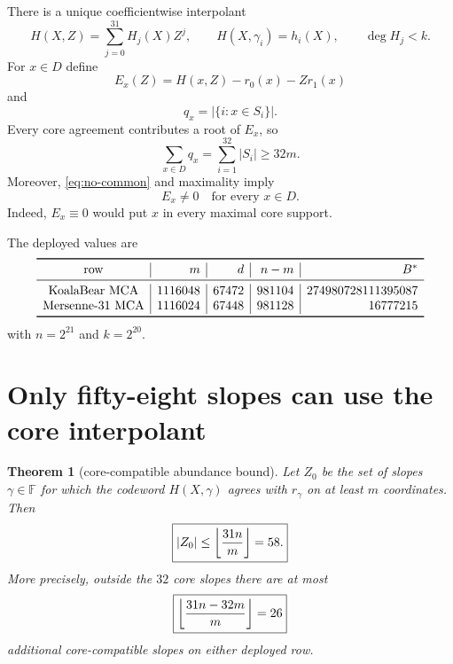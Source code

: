 \documentclass[11pt,a4paper]{amsart}
\numberwithin{equation}{section}
\newtheorem{theorem}{Theorem}[section]
\theoremstyle{remark}
\newcommand{\F}{\mathbb F}\newcommand{\B}{\mathbb B}\newcommand{\K}{\mathbb K}\newcommand{\Z}{\mathbb Z}
\begin{document}
There is a unique coefficientwise interpolant
\begin{equation}\label{eq:H}
 H(X,Z)=\sum_{j=0}^{31}H_j(X)Z^j,
 \qquad H(X,\gamma_i)=h_i(X),
 \qquad \deg H_j<k.
\end{equation}
For $x\in D$ define
\begin{equation}\label{eq:Ex}
 E_x(Z)=H(x,Z)-r_0(x)-Zr_1(x)
\end{equation}
and
\[
 q_x=|\{i:x\in S_i\}|.
\]
Every core agreement contributes a root of $E_x$, so
\begin{equation}\label{eq:qsum}
 \sum_{x\in D}q_x=\sum_{i=1}^{32}|S_i|\ge32m.
\end{equation}
Moreover, \eqref{eq:no-common} and maximality imply
\begin{equation}\label{eq:nonzero-E}
 E_x\ne0\quad\text{for every }x\in D.
\end{equation}
Indeed, $E_x\equiv0$ would put $x$ in every maximal core support.

The deployed values are
\[
\begin{array}{c|r|r|r|r}
\toprule
\text{row}&m&d&n-m&B^*\\
\midrule
\text{KoalaBear MCA}&1116048&67472&981104&274980728111395087\\
\text{Mersenne-31 MCA}&1116024&67448&981128&16777215\\
\bottomrule
\end{array}
\]
with $n=2^{21}$ and $k=2^{20}$.

\section{Only fifty-eight slopes can use the core interpolant}

\begin{theorem}[core-compatible abundance bound]\label{thm:core-compatible}
Let $Z_0$ be the set of slopes $\gamma\in\F$ for which the codeword $H(X,\gamma)$ agrees with $r_\gamma$ on at least $m$ coordinates.  Then
\begin{equation}\label{eq:58}
 \boxed{
 |Z_0|\le\left\lfloor \frac{31n}{m}\right\rfloor=58.
 }
\end{equation}
More precisely, outside the $32$ core slopes there are at most
\begin{equation}\label{eq:26}
 \boxed{
 \left\lfloor \frac{31n-32m}{m}\right\rfloor=26
 }
\end{equation}
additional core-compatible slopes on either deployed row.
\end{theorem}
\end{document}
